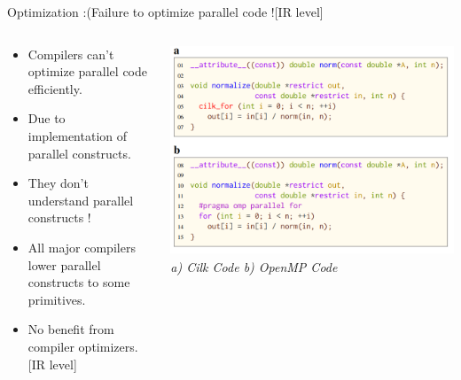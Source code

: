 \documentclass{beamer}
\begin{document}
\begin{frame}{Optimization :(}{Failure to optimize parallel code ![IR level]}
  \begin{columns}[T]
  \begin{column}{0.5\textwidth}
  \begin{itemize}
      \item Compilers can't optimize parallel code efficiently.
      \item Due to implementation of parallel constructs.
      \item They don't understand parallel constructs !
      \item All major compilers \alert{lower} parallel constructs to some primitives.
      \item No benefit from compiler optimizers. [IR level]
  \end{itemize}
  
  \end{column}
  \begin{column}{0.5\textwidth}
    \includegraphics[scale=0.1, width=\textwidth]{opt_ex1}\\
    {\em a) Cilk Code  b) OpenMP Code}
  
  \end{column}
  
  \end{columns}
  
\end{frame}
\end{document}
